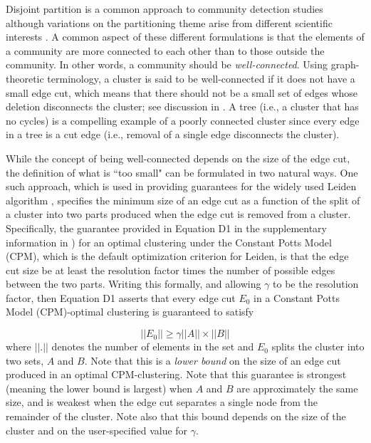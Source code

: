 \documentclass[11pt]{article}   	%
\begin{document}
Disjoint partition is a  common approach to community detection studies \citep{Fortunato2022,Fortunato2010} although variations on the partitioning theme arise from different scientific interests \citep{Coscia2011,Schaub2017}.
A common aspect of these different formulations is that  the elements of a community are more connected to each other than to those outside the community. In other words, a community
should be {\em well-connected}.
Using graph-theoretic terminology, a cluster is said to be well-connected if it does not have a small edge cut, which means that there should not be a small set of edges whose deletion
disconnects the cluster; see discussion in \cite{Traag_2019}. A tree  (i.e., a cluster that has no cycles) is  a compelling example of a poorly connected cluster since every edge in  a tree is a cut edge (i.e.,  removal of a single edge
disconnects the cluster).

While the concept of being well-connected depends on the size of the edge cut, the definition of what is ``too small" can be formulated in two natural ways. One such  approach, which is used in
providing guarantees for the widely used Leiden algorithm \citep{Traag_2019}, specifies the minimum size of an edge cut as a function of the split  of a cluster into two parts produced
when the edge cut is removed from a cluster. Specifically, the guarantee provided   in Equation D1 in the supplementary information in \cite{Traag_2019}) for an optimal clustering under the Constant Potts Model (CPM), which is the default optimization criterion for Leiden, is that the edge cut size be at least the resolution factor   times the number of possible edges between the two  parts. Writing this formally, and allowing $\gamma$ to be the resolution factor, then Equation D1 asserts that every edge cut $E_0$ in a Constant Potts Model (CPM)-optimal clustering is guaranteed to satisfy

 \begin{equation}
 ||E_0|| \geq \gamma ||A|| \times ||B||
 \label{eqn:cpm-bound}
 \end{equation}
where $||.||$ denotes the number of elements in the set and $E_0$ splits the cluster into two sets, $A$ and $B$.
Note that this is a {\em lower bound} on the size of an edge cut produced in an optimal CPM-clustering.
Note  that this guarantee is strongest (meaning the lower bound is largest) when $A$ and $B$ are approximately the same size, and is weakest when the
edge cut separates a single node from the remainder of the cluster. Note also that this bound depends on the size of the cluster and on   the user-specified value for $\gamma$.
\end{document}
